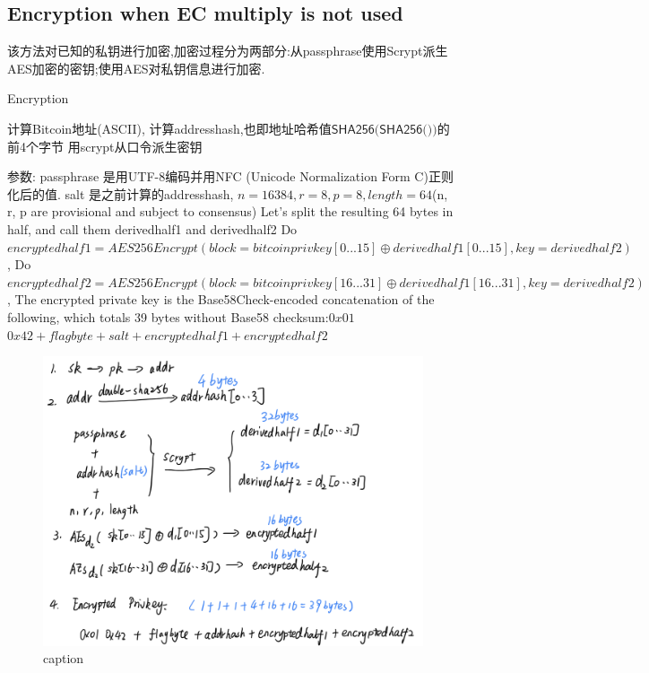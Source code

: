 \subsection{Encryption when EC multiply is not used}

该方法对已知的私钥进行加密,加密过程分为两部分:从passphrase使用Scrypt派生AES加密的密钥;使用AES对私钥信息进行加密.

\begin{algorithm}[tbp]\footnotesize
\caption{Encryption}\label{encryption without ec multiply}
  	\begin{algorithmic}[1]
	    \STATE 计算Bitcoin地址(ASCII), 计算addresshash,也即地址哈希值$\textsf{SHA256(SHA256())}$的前4个字节
		\STATE 用scrypt从口令派生密钥
		
		\STATE 参数: passphrase 是用UTF-8编码并用NFC (Unicode Normalization Form C)正则化后的值. 
		salt 是之前计算的addresshash, $n=16384, r=8, p=8, length=64 $(n, r, p are provisional and subject to consensus)  
		\STATE Let's split the resulting 64 bytes in half, and call them derivedhalf1 and derivedhalf2
		\STATE Do $encryptedhalf1 = AES256Encrypt(block = bitcoinprivkey[0...15] \oplus derivedhalf1[0...15], key = derivedhalf2)$,
		\STATE Do $encryptedhalf2 = AES256Encrypt(block = bitcoinprivkey[16...31] \oplus derivedhalf1[16...31], key = derivedhalf2)$, 
		\STATE The encrypted private key is the Base58Check-encoded concatenation of the following, which totals 39 bytes without Base58 checksum:$0x01$ $0x42 + flagbyte + salt + encryptedhalf1 + encryptedhalf2$
    \end{algorithmic}
\end{algorithm}

\begin{figure}[h]
\centering
\includegraphics[width=.7\textwidth]{./no-ec.png}
\caption{caption}\label{fig-parsesig}
\end{figure}

